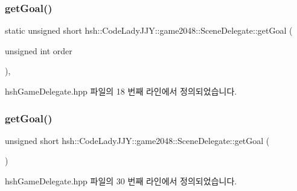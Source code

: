 \subsubsection{\texorpdfstring{get\+Goal()}{getGoal()}\hspace{0.1cm}{\footnotesize\ttfamily [1/2]}}
{\footnotesize\ttfamily static unsigned short hsh\+::\+Code\+Lady\+J\+J\+Y\+::game2048\+::\+Scene\+Delegate\+::get\+Goal (\begin{DoxyParamCaption}\item[{unsigned int}]{order }\end{DoxyParamCaption})\hspace{0.3cm}{\ttfamily [inline]}, {\ttfamily [static]}}



hsh\+Game\+Delegate.\+hpp 파일의 18 번째 라인에서 정의되었습니다.

\mbox{\label{classhsh_1_1_code_lady_j_j_y_1_1game2048_1_1_scene_delegate_a5766c3d3f2f5ee3a4c7664198f362e8f}} 
\subsubsection{\texorpdfstring{get\+Goal()}{getGoal()}\hspace{0.1cm}{\footnotesize\ttfamily [2/2]}}
{\footnotesize\ttfamily unsigned short hsh\+::\+Code\+Lady\+J\+J\+Y\+::game2048\+::\+Scene\+Delegate\+::get\+Goal (\begin{DoxyParamCaption}{ }\end{DoxyParamCaption})\hspace{0.3cm}{\ttfamily [inline]}}



hsh\+Game\+Delegate.\+hpp 파일의 30 번째 라인에서 정의되었습니다.

